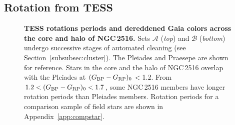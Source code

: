 \documentclass[12pt,twocolumn,tighten]{aastex63}
\newcommand{\cn}{NGC\,2516} %
\newcommand{\bpmrpo}{(G_{\rm BP}-G_{\rm RP})_0}
\begin{document}
\subsection{Rotation from TESS}
\label{subsec:tess}

\begin{figure}[t!]
	\begin{center}
		\leavevmode

    \vspace{-0.7cm}
	\end{center}
	\vspace{-0.7cm}
  \caption{ {\bf TESS rotations periods and dereddened Gaia colors
  across the core and halo of \cn.} Sets $\mathcal{A}$ ({\it top})
  and $\mathcal{B}$ ({\it bottom}) undergo successive stages of
  automated cleaning (see Section~\ref{subsubsec:cluster}).  The Pleiades
  \citep[125\,Myr;][]{rebull_rotation_2016a} and Praesepe
  \citep[650\,Myr;][]{douglas_poking_2017} are shown for reference.
  Stars in the core and the halo of NGC\,2516 overlap with the
  Pleiades at $\bpmrpo$$<$1.2.  From $1.2<\bpmrpo<1.7$, some NGC\,2516
  members have longer rotation periods than Pleiades members. Rotation
  periods for a comparison sample of field stars are shown in
  Appendix~\ref{app:compstar}.
  \label{fig:rot}
	}
\end{figure}
\end{document}
